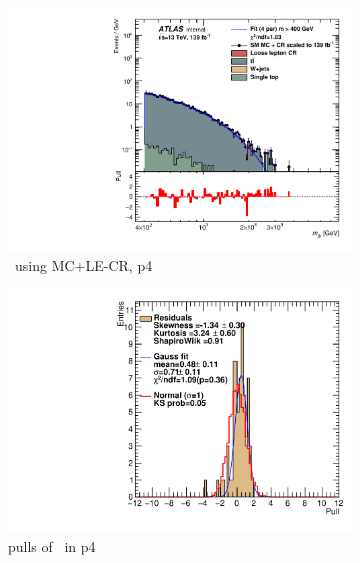 \newpage

\begin{figure}[ht]
    \centering
    \begin{subfigure}[h]{0.38\linewidth}
    \includegraphics[scale=0.3]{figs/ch6/fit/variable_nosmooth/p4/01PB/output_SMMCplusCR_Mjb_p4.pdf}%
    \caption{\mjb \ using MC+LE-CR, p4}
    \end{subfigure}
    \hfill
    \begin{subfigure}[h]{0.4\linewidth}
    \includegraphics[scale=0.32]{figs/ch6/fit/variable_nosmooth/p4/01PB/pull_SMMCplusCR_Mjb_p4.pdf}%
    \caption{pulls of \mjb \ in p4}
    \end{subfigure}
    \hfill
    \begin{subfigure}[h]{0.38\linewidth}

\end{subfigure}
\end{figure}
